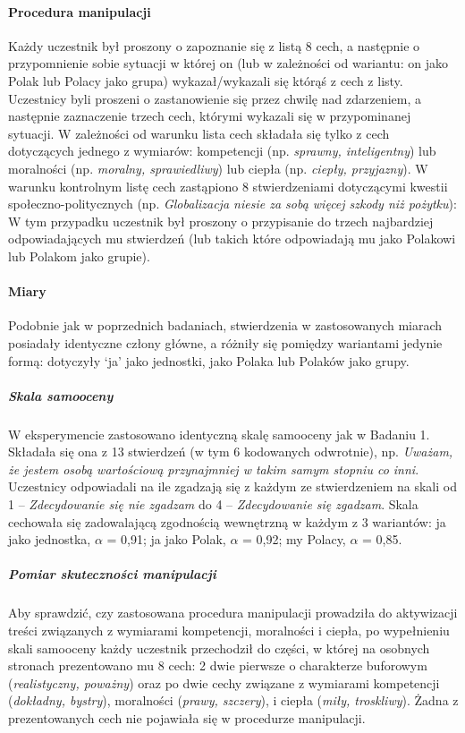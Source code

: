 \documentclass[man]{apa6}
\begin{document}
\paragraph{Procedura manipulacji}
Każdy uczestnik był proszony o zapoznanie się z listą 8 cech, a następnie o przypomnienie sobie sytuacji w której on (lub w zależności od wariantu: on jako Polak lub Polacy jako grupa) wykazał/wykazali się którąś z cech z listy. Uczestnicy byli proszeni o zastanowienie się przez chwilę nad zdarzeniem, a następnie zaznaczenie trzech cech, którymi wykazali się w przypominanej sytuacji. W zależności od warunku lista cech składała się tylko z cech dotyczących jednego z wymiarów: kompetencji (np. \emph{sprawny, inteligentny}) lub moralności (np. \emph{moralny, sprawiedliwy}) lub ciepła (np. \emph{ciepły, przyjazny}). W warunku kontrolnym listę cech zastąpiono 8 stwierdzeniami dotyczącymi kwestii społeczno-politycznych (np. \emph{Globalizacja niesie za sobą więcej szkody niż pożytku}): W tym przypadku uczestnik był proszony o przypisanie do trzech najbardziej odpowiadających mu stwierdzeń (lub takich które odpowiadają mu jako Polakowi lub Polakom jako grupie).

\paragraph{Miary}
Podobnie jak w poprzednich badaniach, stwierdzenia w zastosowanych miarach posiadały identyczne człony główne, a różniły się pomiędzy wariantami jedynie formą: dotyczyły `ja' jako jednostki, jako Polaka lub Polaków jako grupy.

\subparagraph{Skala samooceny}
W eksperymencie zastosowano identyczną skalę samooceny jak w Badaniu 1. Składała się ona z 13 stwierdzeń (w tym 6 kodowanych odwrotnie), np. \emph{Uważam, że jestem osobą wartościową przynajmniej w takim samym stopniu co inni}. Uczestnicy odpowiadali na ile zgadzają się z każdym ze stwierdzeniem na skali od 1 -- \emph{Zdecydowanie się nie zgadzam} do 4 -- \emph{Zdecydowanie się zgadzam}. Skala cechowała się zadowalającą zgodnością wewnętrzną w każdym z 3 wariantów: ja jako jednostka, $\alpha$ = 0,91; ja jako Polak, $\alpha$ = 0,92; my Polacy, $\alpha$ = 0,85.
\subparagraph{Pomiar skuteczności manipulacji}
Aby sprawdzić, czy zastosowana procedura manipulacji prowadziła do aktywizacji treści związanych z wymiarami kompetencji, moralności i ciepła, po wypełnieniu skali samooceny każdy uczestnik przechodził do części, w której na osobnych stronach prezentowano mu 8 cech: 2 dwie pierwsze o charakterze buforowym (\emph{realistyczny, poważny}) oraz po dwie cechy związane z wymiarami kompetencji (\emph{dokładny, bystry}), moralności (\emph{prawy, szczery}), i ciepła (\emph{miły, troskliwy}). Żadna z prezentowanych cech nie pojawiała się w procedurze manipulacji. \\
\end{document}
